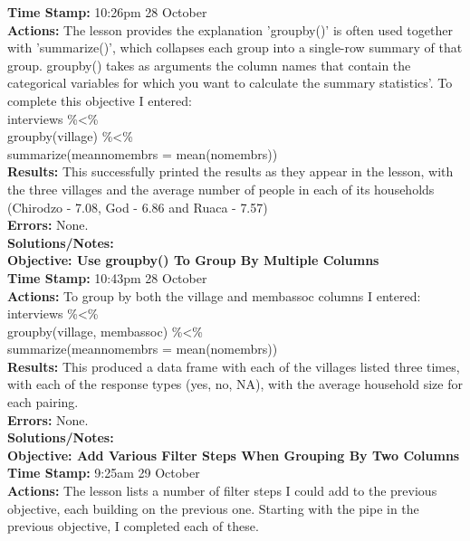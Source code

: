 \documentclass{article}
\begin{document}
\begin{FlushLeft}
\textbf{Time Stamp:} 10:26pm 28 October\\
\textbf{Actions:} The lesson provides the explanation 'group\textunderscore by()' is often used together with 'summarize()', which collapses each group into a single-row summary of that group. group\textunderscore by() takes as arguments the column names that contain the categorical variables for which you want to calculate the summary statistics'. To complete this objective I entered:\\
interviews \%\textless\%\\
group\textunderscore by(village) \%\textless\%\\
summarize(mean\textunderscore no\textunderscore membrs = mean(no\textunderscore membrs))\\
\textbf{Results:} This successfully printed the results as they appear in the lesson, with the three villages and the average number of people in each of its households (Chirodzo - 7.08, God - 6.86 and Ruaca - 7.57)\\
\textbf{Errors:} None.\\
\textbf{Solutions/Notes:}\\
\vspace{5mm}
\textbf{Objective: Use group\textunderscore by() To Group By Multiple Columns}\\ 
\textbf{Time Stamp:} 10:43pm 28 October\\
\textbf{Actions:} To group by both the village and memb\textunderscore assoc columns I entered:\\
interviews \%\textless\%\\
group\textunderscore by(village, memb\textunderscore assoc) \%\textless\%\\
summarize(mean\textunderscore no\textunderscore membrs = mean(no\textunderscore membrs))\\
\textbf{Results:} This produced a data frame with each of the villages listed three times, with each of the response types (yes, no, NA), with the average household size for each pairing.\\
\textbf{Errors:} None.\\
\textbf{Solutions/Notes:}\\
\vspace{5mm}
\textbf{Objective: Add Various Filter Steps When Grouping By Two Columns}\\ 
\textbf{Time Stamp:} 9:25am 29 October\\
\textbf{Actions:} The lesson lists a number of filter steps I could add to the previous objective, each building on the previous one. Starting with the pipe in the previous objective, I completed each of these.

\end{FlushLeft}
\end{document}
